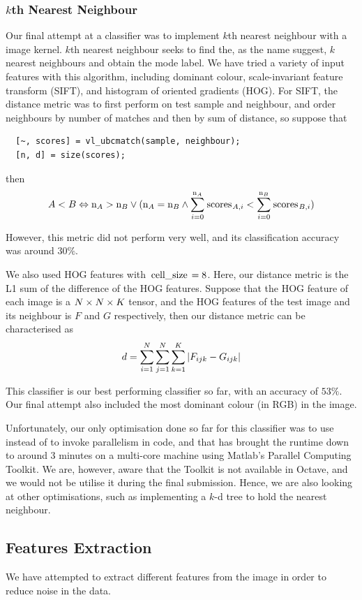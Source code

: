 \documentclass{article} %
\begin{document}
\subsubsection{$k$th Nearest Neighbour}
Our final attempt at a classifier was to implement $k$th nearest neighbour with a image kernel. $k$th nearest neighbour seeks to find the, as the name suggest, $k$ nearest neighbours and obtain the mode label. We have tried a variety of input features with this algorithm, including dominant colour, scale-invariant feature transform (SIFT), and histogram of oriented gradients (HOG). For SIFT, the distance metric was to first perform  on test sample and neighbour, and order neighbours by number of matches and then by sum of distance, so suppose that
\begin{lstlisting}
  [~, scores] = vl_ubcmatch(sample, neighbour);
  [n, d] = size(scores);
\end{lstlisting}
then
$$A < B \eqv \codem{n}_A>\codem{n}_B \/ (\codem{n}_A=\codem{n}_B\+\summ{i=0}{\codem{n}_A}{\codem{scores}_{A,i}}<\summ{i=0}{\codem{n}_B}{\codem{scores}_{B,i}})$$

However, this metric did not perform very well, and its classification accuracy was around $30\%$.

We also used HOG features with $\codem{cell_size}=8$. Here, our distance metric is the L1 sum of the difference of the HOG features. Suppose that the HOG feature of each image is a $N\x N\x K$ tensor, and the HOG features of the test image and its neighbour is $F$ and $G$ respectively, then our distance metric can be characterised as
$$d=\summ{i=1}{N}\summ{j=1}{N}\summ{k=1}{K}|F_{ijk}-G_{ijk}|$$

This classifier is our best performing classifier so far, with an accuracy of $53\%$. Our final attempt also included the most dominant colour (in RGB) in the image.

Unfortunately, our only optimisation done so far for this classifier was to use  instead of  to invoke parallelism in code, and that has brought the runtime down to around 3 minutes on a multi-core machine using Matlab's Parallel Computing Toolkit. We are, however, aware that the Toolkit is not available in Octave, and we would not be utilise it during the final submission. Hence, we are also looking at other optimisations, such as implementing a $k$-d tree to hold the nearest neighbour.

\subsection{Features Extraction}
We have attempted to extract different features from the image in order to reduce noise in the data.
\end{document}
